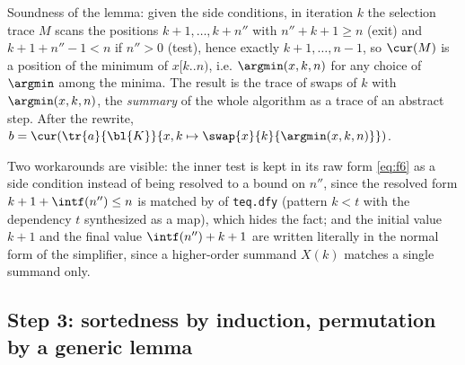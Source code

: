 Soundness of the lemma: given the side conditions, in iteration $k$ the selection trace $M$ scans the
positions $k + 1, \ldots, k + n''$ with $n'' + k + 1 \ge n$ (exit) and $k + 1 + n'' - 1 < n$ if $n'' > 0$
(test), hence exactly $k + 1, \ldots, n - 1$, so $\cur(M)$ is a position of the minimum of $x[k..n)$,
i.e. $\argmin(x, k, n)$ for any choice of $\argmin$ among the minima. The result is the trace of swaps of
$k$ with $\argmin(x, k, n)$, the \emph{summary} of the whole algorithm as a trace of an abstract step.
After the rewrite, $b = \cur(\tr{a}{\bl{K}}{x, k \mapsto \swap{x}{k}{\argmin(x, k, n)}})$.

Two workarounds are visible: the inner test is kept in its raw form \eqref{eq:f6} as a side condition
instead of being resolved to a bound on $n''$, since the resolved form $k + 1 + \intf(n'') \le n$ is
matched by  of \texttt{teq.dfy} (pattern $k < t$ with the dependency $t$
synthesized as a map), which hides the fact; and the initial value $k + 1$ and the final value
$\intf(n'') + k + 1$ are written literally in the normal form of the simplifier, since a higher-order
summand $X(k)$ matches a single summand only.

\subsection{Step 3: sortedness by induction, permutation by a generic lemma}\label{sec:sel:ind}

